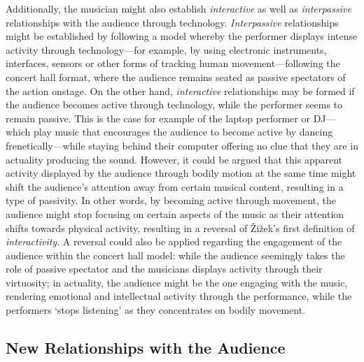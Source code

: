 Additionally, the musician might also establish \emph{interactive} as well as \emph{interpassive} relationships with the audience through technology. \emph{Interpassive} relationships might be established by following a model whereby the performer displays intense activity through technology---for example, by using electronic instruments, interfaces, sensors or other forms of tracking human movement---following the concert hall format, where the audience remains seated as passive spectators of the action onstage. On the other hand, \emph{interactive} relationships may be formed if the audience becomes active through technology, while the performer seems to remain passive. This is the case for example of the laptop performer or DJ---which play music that encourages the audience to become active by dancing frenetically---while staying behind their computer offering no clue that they are in actuality producing the sound. However, it could be argued that this apparent activity displayed by the audience through bodily motion at the same time might shift the audience's attention away from certain musical content, resulting in a type of passivity. In other words, by becoming active through movement, the audience might stop focusing on certain aspects of the music as their attention shifts towards physical activity, resulting in a reversal of \v{Z}i\v{z}ek's first definition of \emph{interactivity}. A reversal could also be applied regarding the engagement of the audience within the concert hall model: while the audience seemingly takes the role of passive spectator and the musicians displays activity through their virtuosity; in actuality, the audience might be the one engaging with the music, rendering emotional and intellectual activity through the performance, while the performers `stops listening' as they concentrates on bodily movement. 

\subsection{New Relationships with the Audience}

